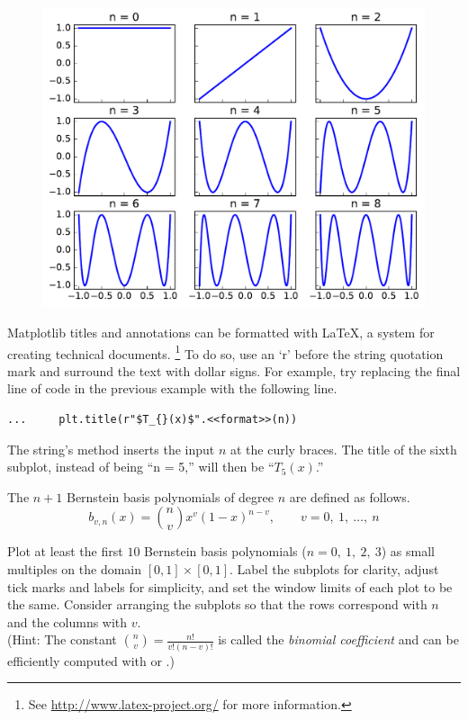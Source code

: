 \begin{figure}[H] %
    \centering
    \includegraphics[width=.7\linewidth]{figures/chebyshev_good.pdf}
\end{figure}

\begin{info} %
Matplotlib titles and annotations can be formatted with \LaTeX, a system for creating technical documents.%
\footnote{See \url{http://www.latex-project.org/} for more information.}
To do so, use an `r' before the string quotation mark and surround the text with dollar signs.
For example, try replacing the final line of code in the previous example with the following line.

\begin{lstlisting}
...     plt.title(r"$T_{}(x)$".<<format>>(n))
\end{lstlisting}

The string's  method inserts the input $n$ at the curly braces.
The title of the sixth subplot, instead of being ``n = 5,'' will then be ``$T_5(x)$.''
\end{info}


\begin{problem} %
The $n+1$ Bernstein basis polynomials of degree $n$ are defined as follows.
\[b_{v,n}(x) = {{n} \choose {v}} x^v (1-x)^{n-v},\qquad v = 0,\ 1,\ \ldots,\ n\]

Plot at least the first $10$ Bernstein basis polynomials ($n = 0,\ 1,\ 2,\ 3$) as small multiples on the domain $[0,1] \times [0,1]$.
Label the subplots for clarity, adjust tick marks and labels for simplicity, and set the window limits of each plot to be the same.
Consider arranging the subplots so that the rows correspond with $n$ and the columns with $v$.
\\(Hint: The constant ${{n} \choose {v}} = \frac{n!}{v!(n-v)!}$ is called the \emph{binomial coefficient} and can be efficiently computed with  or .)
\end{problem}

